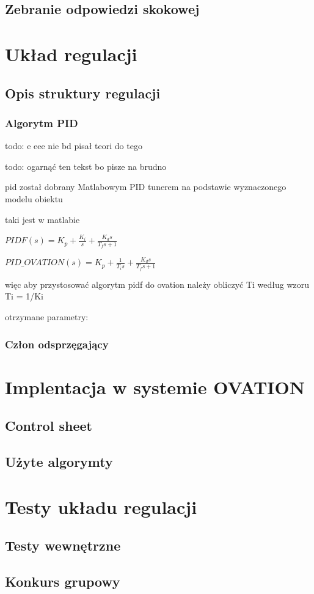 \documentclass{mwrep}
\begin{document}
\section{Zebranie odpowiedzi skokowej}
\label{OdpowiedzSkokowa}

\chapter{Układ regulacji}
\label{UkladRegulacji}

\section{Opis struktury regulacji}
\label{OpisStruktury}

\subsection{Algorytm PID}
\label{PID}

todo: e eee nie bd pisał teori do tego

todo: ogarnąć ten tekst bo pisze na brudno

pid został dobrany Matlabowym PID tunerem na podstawie wyznaczonego modelu obiektu

taki jest w matlabie 

$PIDF(s) = K _ { p } + \frac { K _ { i } } { s } + \frac { K _ { d } s } { T _ { f } s + 1 }$

$PID\_OVATION(s) = K _ { p } + \frac { 1 } {  T _ { i } s } + \frac { K _ { d } s } { T _ { f } s + 1 }$

więc aby przystosować algorytm pidf do ovation należy obliczyć Ti według wzoru Ti = 1/Ki

otrzymane parametry:







\subsection{Człon odsprzęgający}
\label{Odsprzeganie}

\chapter{Implentacja w systemie OVATION}
\label{OVATION}

\section{Control sheet}
\label{ControlSheet}

\section{Użyte algorymty}
\label{AlgorytmyOVATION}

\chapter{Testy układu regulacji}
\label{Testy}

\section{Testy wewnętrzne}
\label{TestyWewnetrzne}

\section{Konkurs grupowy}
\label{Konkurs}
\end{document}
